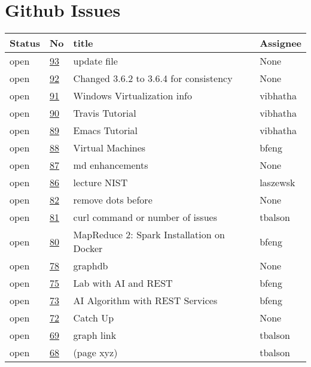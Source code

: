 \section{Github Issues}
\begin{center}
\begin{tabular}{llll}
Status & No & title & Assignee\\
\hline
open & \href{https://github.com/cloudmesh/book/pull/93}{93} & update file & None\\
open & \href{https://github.com/cloudmesh/book/pull/92}{92} & Changed 3.6.2 to 3.6.4 for consistency & None\\
open & \href{https://github.com/cloudmesh/book/issues/91}{91} & Windows Virtualization info & vibhatha\\
open & \href{https://github.com/cloudmesh/book/issues/90}{90} & Travis Tutorial & vibhatha\\
open & \href{https://github.com/cloudmesh/book/issues/89}{89} & Emacs Tutorial & vibhatha\\
open & \href{https://github.com/cloudmesh/book/issues/88}{88} & Virtual Machines  & bfeng\\
open & \href{https://github.com/cloudmesh/book/issues/87}{87} & md enhancements & None\\
open & \href{https://github.com/cloudmesh/book/issues/86}{86} & lecture NIST & laszewsk\\
open & \href{https://github.com/cloudmesh/book/issues/82}{82} & remove  dots before \cite{} & None\\
open & \href{https://github.com/cloudmesh/book/issues/81}{81} & curl command or number of issues  & tbalson\\
open & \href{https://github.com/cloudmesh/book/issues/80}{80} & MapReduce 2: Spark Installation on Docker  & bfeng\\
open & \href{https://github.com/cloudmesh/book/issues/78}{78} & graphdb & None\\
open & \href{https://github.com/cloudmesh/book/issues/75}{75} & Lab with AI and REST & bfeng\\
open & \href{https://github.com/cloudmesh/book/issues/73}{73} & AI Algorithm with REST Services & bfeng\\
open & \href{https://github.com/cloudmesh/book/issues/72}{72} & Catch Up & None\\
open & \href{https://github.com/cloudmesh/book/issues/69}{69} & graph link & tbalson\\
open & \href{https://github.com/cloudmesh/book/issues/68}{68} & (page xyz) & tbalson\\

\end{tabular}
\end{center}
